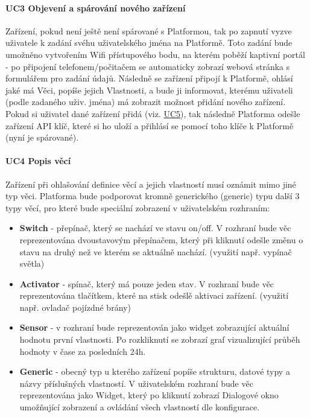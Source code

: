 \paragraph{UC3 Objevení a spárování nového zařízení}
Zařízení, pokud není ještě není spárované s Platformou, tak po zapnutí vyzve uživatele k zadání svéhu uživatelského jména na Platformě. Toto zadání bude umožněno vytvořením Wifi přístupového bodu, na kterém poběží kaptivní portál - po připojení telefonem/počitačem se automaticky zobrazí webová stránka s formulářem pro zadání údajů. Následně se zařízení připojí k Platformě, ohlásí jaké má Věci, popíše jejich Vlastnosti, a bude ji informovat, kterému uživateli (podle zadaného uživ. jména) má zobrazit možnost přidání nového zařízení. Pokud si uživatel dané zařízení přidá (viz. \hyperref[UC5]{UC5}), tak následně Platforma odešle zařízení API klíč, které si ho uloží a přihlásí se pomocí toho klíče k Platformě (nyní je spárované).

\paragraph{UC4 Popis věcí}
Zařízení při ohlašování definice věcí a jejich vlastností musí oznámit mimo jiné typ věci. Platforma bude podporovat kromně generického (generic) typu další 3 typy věcí, pro které bude speciální zobrazení v uživatelském rozhraním:
\begin{itemize}
    \item \textbf{Switch} - přepínač, který se nachází ve stavu on/off. V rozhraní bude věc reprezentována dvoustavovým přepínačem, který při kliknutí odešle změnu o stavu na druhý než ve kterém se aktuálně nachází. (využití např. vypínač světla)
    \item \textbf{Activator} - spínač, který má pouze jeden stav. V rozhraní bude věc reprezentována tlačítkem, které na stisk odešlě aktivaci zařízení. (využití např. ovladač pojízdné brány)
    \item \textbf{Sensor} - v rozhraní bude reprezentován jako widget zobrazující aktuální hodnotu první vlastnosti. Po rozkliknutí se zobrazí graf vizualizující průběh hodnoty v čase za posledních 24h.
    \item \textbf{Generic} - obecný typ u kterého zařízení popíše strukturu, datové typy a názvy příslušných vlastností. V uživatelském rozhraní bude věc reprezentována jako Widget, který po kliknutí zobrazí Dialogové okno umožňující zobrazení a ovládání všech vlastností dle konfigurace.
\end{itemize}


